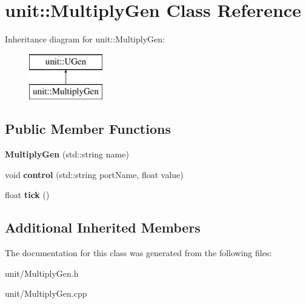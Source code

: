 \hypertarget{classunit_1_1MultiplyGen}{}\section{unit\+:\+:Multiply\+Gen Class Reference}
\label{classunit_1_1MultiplyGen}
Inheritance diagram for unit\+:\+:Multiply\+Gen\+:\begin{figure}[H]
\begin{center}
\leavevmode
\includegraphics[height=2.000000cm]{classunit_1_1MultiplyGen}
\end{center}
\end{figure}
\subsection*{Public Member Functions}
\begin{DoxyCompactItemize}
\item 
{\bfseries Multiply\+Gen} (std\+::string name)\hypertarget{classunit_1_1MultiplyGen_a8c63aba9e9be634e03f900182b4a1d7a}{}\label{classunit_1_1MultiplyGen_a8c63aba9e9be634e03f900182b4a1d7a}

\item 
void {\bfseries control} (std\+::string port\+Name, float value)\hypertarget{classunit_1_1MultiplyGen_a399981309ef24f24c7044172e58c1e8a}{}\label{classunit_1_1MultiplyGen_a399981309ef24f24c7044172e58c1e8a}

\item 
float {\bfseries tick} ()\hypertarget{classunit_1_1MultiplyGen_abeeb8a84f91375454120639a9bb810fb}{}\label{classunit_1_1MultiplyGen_abeeb8a84f91375454120639a9bb810fb}

\end{DoxyCompactItemize}
\subsection*{Additional Inherited Members}


The documentation for this class was generated from the following files\+:\begin{DoxyCompactItemize}
\item 
unit/Multiply\+Gen.\+h\item 
unit/Multiply\+Gen.\+cpp\end{DoxyCompactItemize}
